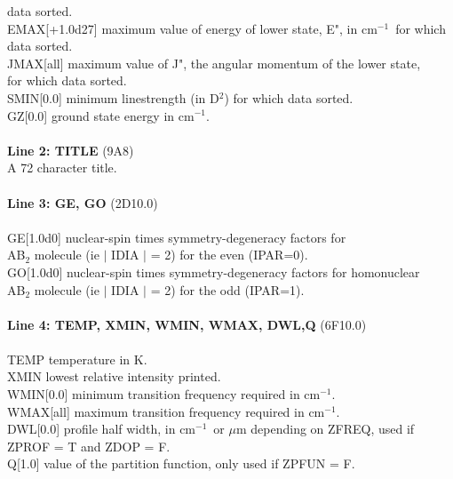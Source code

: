 \documentclass{elsart}
\def\cm{{cm$^{-1}$}}
\begin{document}
\begin{tabbing}
data sorted.\\
EMAX[+1.0d27] maximum value of energy of lower state, E", in \cm\ for which
data sorted.\\
JMAX[all] \> maximum value of J", the angular momentum of the lower state, \\
\> for which data sorted.\\
SMIN[0.0] \> minimum linestrength (in D$^2$) for which data sorted.\\
GZ[0.0] \> ground state energy in cm$^{-1}$.\\
\\
{\bf Line 2: TITLE} (9A8)\\
A 72 character title.\\
\\
{\bf Line 3: GE, GO} (2D10.0) \\
\\
GE[1.0d0] \> nuclear-spin times symmetry-degeneracy factors for \\
\> AB$_2$ molecule (ie $\mid$ IDIA $\mid$ = 2) for the even (IPAR=0).\\
GO[1.0d0] \> nuclear-spin times symmetry-degeneracy factors for homonuclear\\
\> AB$_2$ molecule (ie $\mid$ IDIA $\mid$ = 2) for the odd (IPAR=1).\\
\\
{\bf Line 4: TEMP, XMIN, WMIN, WMAX, DWL,Q} (6F10.0) \\
\\
TEMP \> temperature in K.\\
XMIN \> lowest relative intensity printed.\\
WMIN[0.0] \> minimum transition frequency required in \cm.\\
WMAX[all] \> maximum transition frequency required in \cm.\\
DWL[0.0] \> profile half width, in \cm\ or $\mu$m depending on ZFREQ,
used if ZPROF = T and ZDOP = F.\\
Q[1.0] \> value of the partition function, only used if ZPFUN = F.\\
\\


\end{tabbing}
\end{document}

